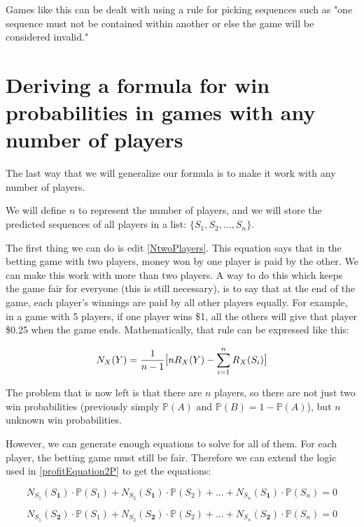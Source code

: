 \documentclass[english,12pt,a4paper,final]{article}
\begin{document}
Games like this can be dealt with using a rule for picking sequences such as "one sequence must not be contained within another or else the game will be considered invalid."

\part{Deriving a formula for win probabilities in games with any number of players}

The last way that we will generalize our formula is to make it work with any number of players.

We will define $n$ to represent the number of players, and we will store the predicted sequences of all players in a list: $\{S_1, S_2, ..., S_n\}$.

The first thing we can do is edit \eqref{NtwoPlayers}. This equation says that in the betting game with two players, money won by one player is paid by the other. We can make this work with more than two players. A way to do this which keeps the game fair for everyone (this is still necessary), is to say that at the end of the game, each player's winnings are paid by all other players equally. For example, in a game with 5 players, if one player wins \$1, all the others will give that player \$0.25 when the game ends. Mathematically, that rule can be expressed like this:

\begin{equation}\label{Ndef}
	N_{X}(Y) = \frac{1}{n-1} \mathlarger{[}nR_{X}(Y) - \sum_{i=1}^{n}R_{X}(S_i)\mathlarger{]}
\end{equation}

The problem that is now left is that there are $n$ players, so there are not just two win probabilities (previously simply $\mathbb{P}(A)$ and $\mathbb{P}(B) = 1-\mathbb{P}(A)$), but $n$ unknown win probabilities.

However, we can generate enough equations to solve for all of them. For each player, the betting game must still be fair. Therefore we can extend the logic used in \eqref{profitEquation2P} to get the equations:

\begin{equation*}
	N_{S_1}(S_\textbf{1}) \cdot \mathbb{P}(S_1) + N_{S_2}(S_\textbf{1}) \cdot \mathbb{P}(S_2) + ... + N_{S_n}(S_\textbf{1}) \cdot \mathbb{P}(S_n) = 0
\end{equation*}

\begin{equation*}
	N_{S_1}(S_\textbf{2}) \cdot \mathbb{P}(S_1) + N_{S_2}(S_\textbf{2}) \cdot \mathbb{P}(S_2) + ... + N_{S_n}(S_\textbf{2}) \cdot \mathbb{P}(S_n) = 0
\end{equation*}
\end{document}
